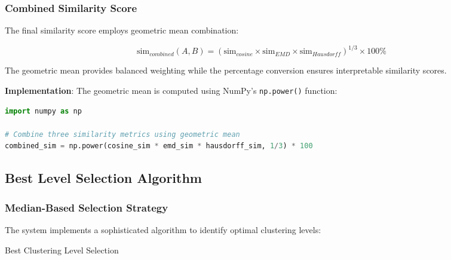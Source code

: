\subsubsection{Combined Similarity Score}
The final similarity score employs geometric mean combination:

\begin{equation}
\text{sim}_{combined}(A,B) = (\text{sim}_{cosine} \times \text{sim}_{EMD} \times \text{sim}_{Hausdorff})^{1/3} \times 100\%
\end{equation}

The geometric mean provides balanced weighting while the percentage conversion ensures interpretable similarity scores.

\textbf{Implementation}: The geometric mean is computed using NumPy's \texttt{np.power()} function:

\begin{tcolorbox}[
    colback=gray!5!white,
    colframe=gray!60!black,
    title=\textbf{Geometric Mean Similarity Combination},
    fonttitle=\bfseries,
    enhanced,
    arc=2mm,
    boxrule=0.5pt
]
\begin{lstlisting}[language=Python]
import numpy as np

# Combine three similarity metrics using geometric mean
combined_sim = np.power(cosine_sim * emd_sim * hausdorff_sim, 1/3) * 100
\end{lstlisting}
\end{tcolorbox}



\subsection{Best Level Selection Algorithm}
\label{subsec:best-level-selection}

\subsubsection{Median-Based Selection Strategy}
The system implements a sophisticated algorithm to identify optimal clustering levels:

\begin{algorithm}[H]
\caption{Best Clustering Level Selection}
\end{algorithm}

